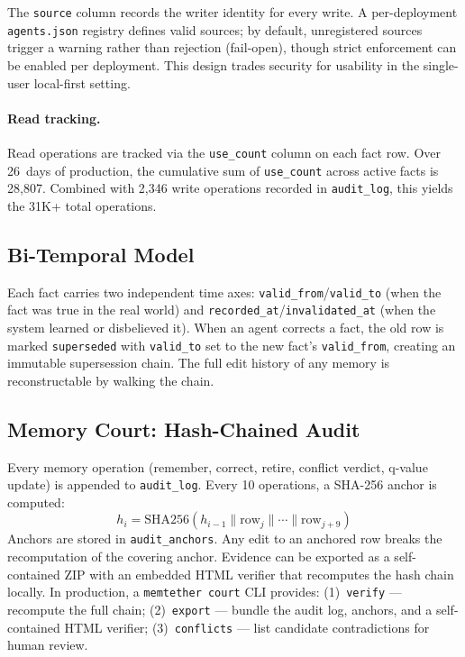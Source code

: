 \documentclass{article}
\begin{document}
The \texttt{source} column records the writer identity for every write. A per-deployment \texttt{agents.json} registry defines valid sources; by default, unregistered sources trigger a warning rather than rejection (fail-open), though strict enforcement can be enabled per deployment. This design trades security for usability in the single-user local-first setting.

\paragraph{Read tracking.}
Read operations are tracked via the \texttt{use\_count} column on each fact row. Over 26~days of production, the cumulative sum of \texttt{use\_count} across active facts is 28{,}807. Combined with 2{,}346 write operations recorded in \texttt{audit\_log}, this yields the 31K+ total operations.

\subsection{Bi-Temporal Model}
Each fact carries two independent time axes: \texttt{valid\_from}/\texttt{valid\_to} (when the fact was true in the real world) and \texttt{recorded\_at}/\texttt{invalidated\_at} (when the system learned or disbelieved it). When an agent corrects a fact, the old row is marked \texttt{superseded} with \texttt{valid\_to} set to the new fact's \texttt{valid\_from}, creating an immutable supersession chain. The full edit history of any memory is reconstructable by walking the chain.

\subsection{Memory Court: Hash-Chained Audit}
Every memory operation (remember, correct, retire, conflict verdict, q-value update) is appended to \texttt{audit\_log}. Every 10 operations, a SHA-256 anchor is computed:
\[
h_i = \text{SHA256}(h_{i-1} \| \text{row}_{j} \| \cdots \| \text{row}_{j+9})
\]
Anchors are stored in \texttt{audit\_anchors}. Any edit to an anchored row breaks the recomputation of the covering anchor. Evidence can be exported as a self-contained ZIP with an embedded HTML verifier that recomputes the hash chain locally. In production, a \texttt{memtether court} CLI provides: (1)~\texttt{verify} --- recompute the full chain; (2)~\texttt{export} --- bundle the audit log, anchors, and a self-contained HTML verifier; (3)~\texttt{conflicts} --- list candidate contradictions for human review.
\end{document}

